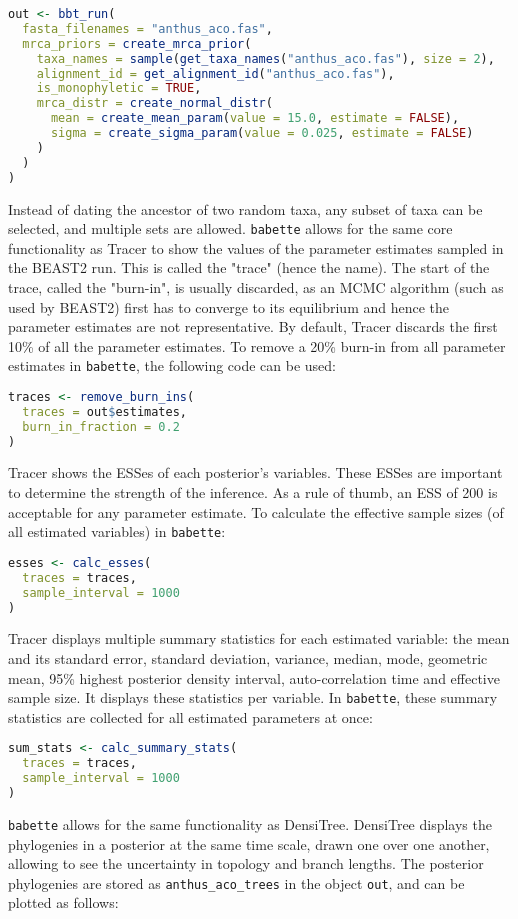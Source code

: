 \begin{lstlisting}[language=R, floatplacement=H]
out <- bbt_run(
  fasta_filenames = "anthus_aco.fas",
  mrca_priors = create_mrca_prior(
    taxa_names = sample(get_taxa_names("anthus_aco.fas"), size = 2),
    alignment_id = get_alignment_id("anthus_aco.fas"),
    is_monophyletic = TRUE,
    mrca_distr = create_normal_distr(
      mean = create_mean_param(value = 15.0, estimate = FALSE),
      sigma = create_sigma_param(value = 0.025, estimate = FALSE)
    )
  )
)
\end{lstlisting}
Instead of dating the ancestor of two random taxa, any subset of taxa can be selected,
and multiple sets are allowed.
\verb;babette; allows for the same core functionality as Tracer to show the values of the parameter estimates sampled
in the BEAST2 run. This is called the "trace" (hence the name).
The start of the trace, called the "burn-in", is usually discarded, as an MCMC 
algorithm (such as used by BEAST2) first has to converge to
its equilibrium and hence the parameter estimates are not 
representative. By default, Tracer discards the first 10\% of all 
the parameter estimates. 
To remove a 20\% burn-in from all parameter estimates 
in \verb;babette;, the following code can be used:

\begin{lstlisting}[language=R, floatplacement=H]
traces <- remove_burn_ins(
  traces = out$estimates, 
  burn_in_fraction = 0.2
)
\end{lstlisting}
Tracer shows the ESSes of each posterior's variables.
These ESSes are important to determine the strength of the
inference. As a rule of thumb, an ESS of 200 is acceptable 
for any parameter estimate.
To calculate the effective sample sizes (of all estimated variables) in \verb;babette;:

\begin{lstlisting}[language=R, floatplacement=H]
esses <- calc_esses(
  traces = traces, 
  sample_interval = 1000
)
\end{lstlisting}
Tracer displays multiple summary statistics for each
estimated variable: the mean and its standard error, standard deviation,
variance, median, mode, geometric mean, 95\% highest posterior density interval, 
auto-correlation time and effective sample size. It displays these statistics per
variable. In \verb;babette;, these summary statistics are collected for
all estimated parameters at once: 

\begin{lstlisting}[language=R, floatplacement=H]
sum_stats <- calc_summary_stats(
  traces = traces, 
  sample_interval = 1000
)
\end{lstlisting}
\verb;babette; allows for the same functionality as DensiTree.
DensiTree displays the phylogenies in a posterior at the same
time scale, drawn one over one another, allowing to see the uncertainty in
topology and branch lengths. 
The posterior phylogenies are stored as \verb;anthus_aco_trees; in the object \verb;out;,
and can be plotted as follows:

